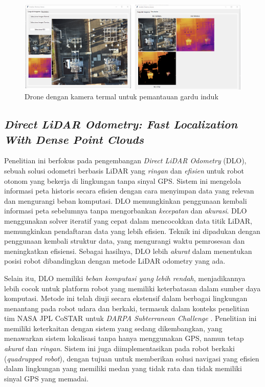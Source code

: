 \begin{figure} [H] \centering
  \includegraphics[scale=0.6]{gambar/drone.png}
  \caption{Drone dengan kamera termal untuk pemantauan gardu induk}
  \label{fig:Drone dengan kamera termal untuk pemantauan gardu induk}
\end{figure}

\subsection{\emph{Direct LiDAR Odometry: Fast Localization With
Dense Point Clouds}}
Penelitian ini berfokus pada pengembangan \emph{Direct LiDAR Odometry} (DLO), sebuah solusi odometri berbasis LiDAR yang \emph{ringan} dan \emph{efisien} untuk robot otonom yang bekerja di lingkungan tanpa sinyal GPS. Sistem ini mengelola informasi peta historis secara efisien dengan cara menyimpan data yang relevan dan mengurangi beban komputasi. DLO memungkinkan penggunaan kembali informasi peta sebelumnya tanpa mengorbankan \emph{kecepatan} dan \emph{akurasi}. DLO menggunakan solver iteratif yang cepat dalam mencocokkan data titik LiDAR, memungkinkan pendaftaran data yang lebih efisien. Teknik ini dipadukan dengan penggunaan kembali struktur data, yang mengurangi waktu pemrosesan dan meningkatkan efisiensi. Sebagai hasilnya, DLO lebih \emph{akurat} dalam menentukan posisi robot dibandingkan dengan metode LiDAR odometry yang ada.

Selain itu, DLO memiliki \emph{beban komputasi yang lebih rendah}, menjadikannya lebih cocok untuk platform robot yang memiliki keterbatasan dalam sumber daya komputasi. Metode ini telah diuji secara ekstensif dalam berbagai lingkungan menantang pada robot udara dan berkaki, termasuk dalam konteks penelitian tim NASA JPL CoSTAR untuk \emph{DARPA Subterranean Challenge} \cite{Chen2022}. Penelitian ini memiliki keterkaitan dengan sistem yang sedang dikembangkan, yang menawarkan sistem lokalisasi tanpa hanya menggunakan GPS, namun tetap \emph{akurat} dan \emph{ringan}. Sistem ini juga diimplementasikan pada robot berkaki (\emph{quadrupped robot}), dengan tujuan untuk memberikan solusi navigasi yang efisien dalam lingkungan yang memiliki medan yang tidak rata dan tidak memiliki sinyal GPS yang memadai.

